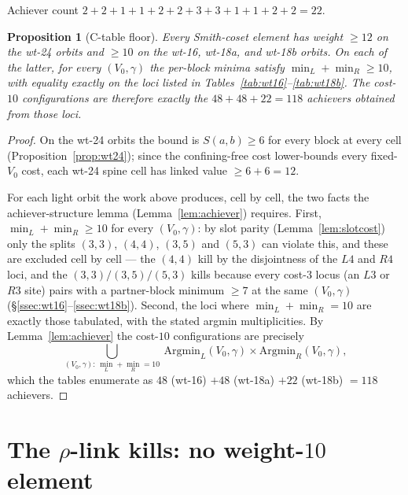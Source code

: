 \documentclass[11pt]{article}
\theoremstyle{plain}
\newtheorem{proposition}[lemma]{Proposition}
\theoremstyle{definition}
\theoremstyle{remark}
\begin{document}
\noindent Achiever count $2+2+1+1+2+2+3+3+1+1+2+2=22$.

\begin{proposition}[C-table floor]\label{prop:ctablefloor}
Every Smith-coset element has weight $\ge 12$ on the wt-24 orbits and $\ge 10$ on the
wt-16, wt-18a, and wt-18b orbits. On each of the latter, for every $(V_0,\gamma)$ the per-block
minima satisfy $\min_L+\min_R\ge 10$, with equality exactly on the loci listed in
Tables~\ref{tab:wt16}--\ref{tab:wt18b}. The cost-$10$ configurations are therefore exactly the
$48+48+22=118$ achievers obtained from those loci.
\end{proposition}

\begin{proof}
On the wt-24 orbits the bound is $S(a,b)\ge 6$ for every block at every cell
(Proposition~\ref{prop:wt24}); since the confining-free cost lower-bounds every fixed-$V_0$
cost, each wt-24 spine cell has linked value $\ge 6+6=12$.

For each light orbit the work above produces, cell by cell, the two facts the
achiever-structure lemma (Lemma~\ref{lem:achiever}) requires. First, $\min_L+\min_R\ge 10$ for
every $(V_0,\gamma)$: by slot parity (Lemma~\ref{lem:slotcost}) only the splits $(3,3)$, $(4,4)$,
$(3,5)$ and $(5,3)$ can violate this, and these are excluded cell by cell --- the $(4,4)$ kill by
the disjointness of the $L4$ and $R4$ loci, and the $(3,3)/(3,5)/(5,3)$ kills because every
cost-$3$ locus (an $L3$ or $R3$ site) pairs with a partner-block minimum $\ge 7$ at the same $(V_0,\gamma)$
(\S\ref{ssec:wt16}--\ref{ssec:wt18b}). Second, the loci where $\min_L+\min_R=10$ are exactly
those tabulated, with the stated argmin multiplicities. By Lemma~\ref{lem:achiever} the
cost-$10$ configurations are precisely
\[
  \bigcup_{(V_0,\gamma):\,\min_L+\min_R=10}\ \mathrm{Argmin}_L(V_0,\gamma)\times\mathrm{Argmin}_R(V_0,\gamma),
\]
which the tables enumerate as $48$ (wt-16) $+48$ (wt-18a) $+22$ (wt-18b) $=118$ achievers.
\end{proof}

\section{The $\rho$-link kills: no weight-$10$ element}\label{sec:rho-kills}
\end{document}
